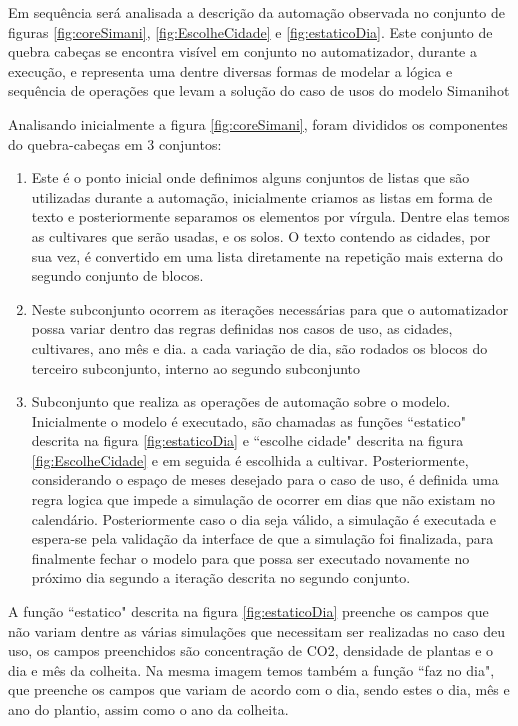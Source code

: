 \documentclass[tg]{mdtufsm}
\begin{document}
                    Em sequência será analisada a descrição da automação observada no conjunto de figuras \ref{fig:coreSimani}, \ref{fig:EscolheCidade} e \ref{fig:estaticoDia}. Este conjunto de quebra cabeças se encontra visível em conjunto no automatizador, durante a execução, e representa uma dentre diversas formas de modelar a lógica e sequência de operações que levam a solução do caso de usos do modelo Simanihot

                    Analisando inicialmente a figura \ref{fig:coreSimani}, foram divididos os componentes do quebra-cabeças em 3 conjuntos:

                    \begin{enumerate}[label*=\arabic*.]
                        \item Este é o ponto inicial onde definimos alguns conjuntos de listas que são utilizadas durante a automação, inicialmente criamos as listas em forma de texto e posteriormente separamos os elementos por vírgula. Dentre elas temos as cultivares que serão usadas, e os solos. O texto contendo as cidades, por sua vez, é convertido em uma lista diretamente na repetição mais externa do segundo conjunto de blocos.
                        \item Neste subconjunto ocorrem as iterações necessárias para que o automatizador possa variar dentro das regras definidas nos casos de uso, as cidades, cultivares, ano mês e dia. a cada variação de dia, são rodados os blocos do terceiro subconjunto, interno ao segundo subconjunto
                        \item Subconjunto que realiza as operações de automação sobre o modelo. Inicialmente o modelo é executado, são chamadas as funções ``estatico" descrita na figura \ref{fig:estaticoDia} e ``escolhe cidade" descrita na figura \ref{fig:EscolheCidade} e em seguida é escolhida a cultivar. Posteriormente, considerando o espaço de meses desejado para o caso de uso, é definida uma regra logica que impede a simulação de ocorrer em dias que não existam no calendário. Posteriormente caso o dia seja válido, a simulação é executada e espera-se pela validação da interface de que a simulação foi finalizada, para finalmente fechar o modelo para que possa ser executado novamente no próximo dia segundo a iteração descrita no segundo conjunto.
                    \end{enumerate}

                    A função ``estatico" descrita na figura \ref{fig:estaticoDia} preenche os campos que não variam dentre as várias simulações que necessitam ser realizadas no caso deu uso, os campos preenchidos são concentração de CO2, densidade de plantas e o dia e mês da colheita. Na mesma imagem temos também a função ``faz no dia", que preenche os campos que variam de acordo com o dia, sendo estes o dia, mês e ano do plantio, assim como o ano da colheita.
\end{document}
